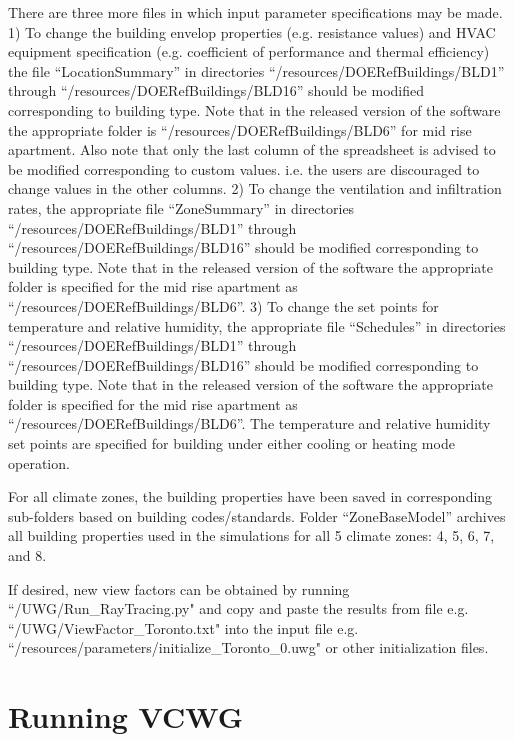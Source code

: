 \documentclass[12pt]{article}
\begin{document}
There are three more files in which input parameter specifications may be made. 1) To change the building envelop properties (e.g. resistance values) and HVAC equipment specification (e.g. coefficient of performance and thermal efficiency) the file ``LocationSummary'' in directories ``/resources/DOERefBuildings/BLD1'' through ``/resources/DOERefBuildings/BLD16'' should be modified corresponding to building type. Note that in the released version of the software the appropriate folder is ``/resources/DOERefBuildings/BLD6'' for mid rise apartment. Also note that only the last column of the spreadsheet is advised to be modified corresponding to custom values. i.e. the users are discouraged to change values in the other columns.  2) To change the ventilation and infiltration rates, the appropriate file ``ZoneSummary'' in directories ``/resources/DOERefBuildings/BLD1'' through ``/resources/DOERefBuildings/BLD16'' should be modified corresponding to building type. Note that in the released version of the software the appropriate folder is specified for the mid rise apartment as ``/resources/DOERefBuildings/BLD6''. 3) To change the set points for temperature and relative humidity, the appropriate file ``Schedules'' in directories ``/resources/DOERefBuildings/BLD1'' through ``/resources/DOERefBuildings/BLD16'' should be modified corresponding to building type. Note that in the released version of the software the appropriate folder is specified for the mid rise apartment as ``/resources/DOERefBuildings/BLD6''. The temperature and relative humidity set points are specified for building under either cooling or heating mode operation.

For all climate zones, the building properties have been saved in corresponding sub-folders based on building codes/standards. Folder ``ZoneBaseModel'' archives all building properties used in the simulations for all 5 climate zones: 4, 5, 6, 7, and 8.

If desired, new view factors can be obtained by running ``/UWG/Run\_RayTracing.py" and copy and paste the results from file e.g. ``/UWG/ViewFactor\_Toronto.txt" into the input file e.g. ``/resources/parameters/initialize\_Toronto\_0.uwg" or other initialization files.

\section{Running VCWG}
\end{document}
